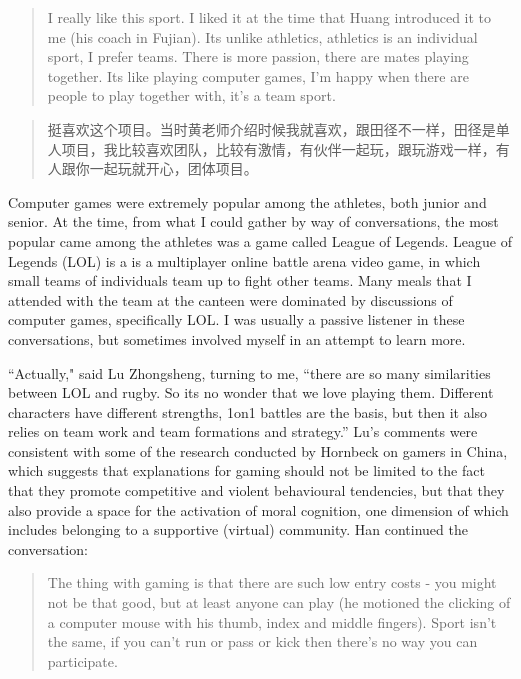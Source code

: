 \begin{CJK}{UTF8}{gbsn}
  \begin{quotation}
      I really like this sport.  I liked it at the time that Huang introduced it to me (his coach in Fujian). Its unlike athletics, athletics is an individual sport, I prefer teams.  There is more passion, there are mates playing together.  Its like playing computer games, I’m happy when there are people to play together with, it's a team sport.
  \end{quotation}

  \begin{quotation}
    	挺喜欢这个项目。当时黄老师介绍时候我就喜欢，跟田径不一样，田径是单人项目，我比较喜欢团队，比较有激情，有伙伴一起玩，跟玩游戏一样，有人跟你一起玩就开心，团体项目。
  \end{quotation}

Computer games were extremely popular among the athletes, both junior and senior.  At the time, from what I could gather by way of conversations, the most popular came among the athletes was a game called League of Legends.  League of Legends (LOL) is a is a multiplayer online battle arena video game, in which small teams of individuals team up to fight other teams.  Many meals that I attended with the team at the canteen were dominated by discussions of computer games, specifically LOL. I was usually a passive listener in these conversations, but sometimes involved myself in an attempt to learn more.


“Actually," said Lu Zhongsheng, turning to me, ``there are so many similarities between LOL and rugby. So its no wonder that we love playing them.  Different characters have different strengths, 1on1 battles are the basis, but then it also relies on team work and team formations and strategy.''  Lu's comments were consistent with some of the research conducted by Hornbeck on gamers in China, which suggests that explanations for gaming should not be limited to the fact that they promote competitive and violent behavioural tendencies, but that they also provide a space for the activation of moral cognition, one dimension of which includes belonging to a supportive (virtual) community. Han continued the conversation:

    \begin{quotation}
          The thing with gaming is that there are such low entry costs - you might not be that good, but at least anyone can play (he motioned the clicking of a computer mouse with his thumb, index and middle fingers).  Sport isn’t the same, if you can’t run or pass or kick then there’s no way you can participate.
    \end{quotation}


\end{CJK}
